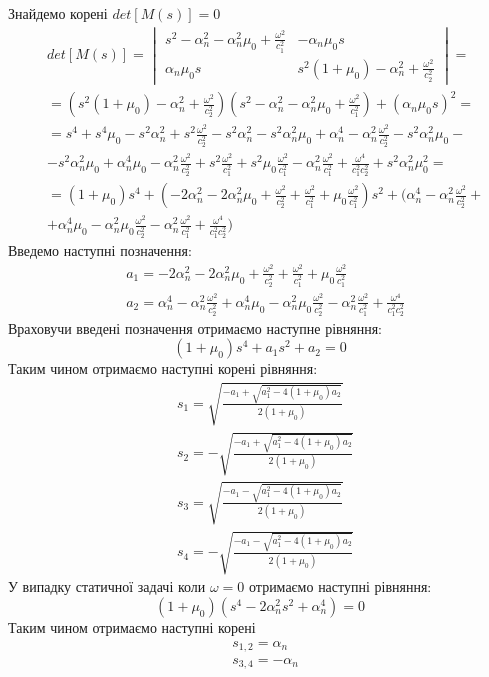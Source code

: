 Знайдемо корені $det[M(s)]=0$
\begin{align*}
    &det[M(s)] = 
    \begin{vmatrix}
        s^2 - \alpha_n^2 - \alpha_n^2\mu_0 + \frac{\omega^2}{c_1^2} & -\alpha_n \mu_0 s \\
        \alpha_n \mu_0 s & s^2 (1 + \mu_0) -\alpha_n^2 + \frac{\omega^2}{c_2^2}
     \end{vmatrix} = \\
    &= (s^2 (1 + \mu_0) -\alpha_n^2 + \frac{\omega^2}{c_2^2})(s^2 - \alpha_n^2 - \alpha_n^2\mu_0 + \frac{\omega^2}{c_1^2}) + (\alpha_n \mu_0 s)^2 = \\
    &= s^4 + s^4 \mu_0 - s^2 \alpha_n^2 + s^2 \frac{\omega^2}{c_2^2} - s^2 \alpha_n^2 - s^2 \alpha_n^2 \mu_0 + \alpha_n^4 - \alpha_n^2 \frac{\omega^2}{c_2^2} - s^2 \alpha_n^2 \mu_0 - \\
    &- s^2 \alpha_n^2 \mu_0 + \alpha_n^4 \mu_0 - \alpha_n^2 \frac{\omega^2}{c_2^2} + s^2 \frac{\omega^2}{c_1^2} + s^2 \mu_0 \frac{\omega^2}{c_1^2} - \alpha_n^2 \frac{\omega^2}{c_1^2} + \frac{\omega^4}{c_1^2 c_2^2} + s^2 \alpha_n^2 \mu_0^2 = \\
    &=(1 + \mu_0) s^4 + (-2 \alpha_n^2 - 2 \alpha_n^2 \mu_0 + \frac{\omega^2}{c_2^2} + \frac{\omega^2}{c_1^2} + \mu_0 \frac{\omega^2}{c_1^2}) s^2 + (\alpha_n^4 - \alpha_n^2 \frac{\omega^2}{c_2^2} + \\ 
    &+ \alpha_n^4 \mu_0 - \alpha_n^2 \mu_0 \frac{\omega^2}{c_2^2} - \alpha_n^2 \frac{\omega^2}{c_1^2} + \frac{\omega^4}{c_1^2 c_2^2})
\end{align*}
Введемо наступні позначення:
\begin{align*}
    &a_1 = -2 \alpha_n^2 - 2 \alpha_n^2 \mu_0 + \frac{\omega^2}{c_2^2} + \frac{\omega^2}{c_1^2} + \mu_0 \frac{\omega^2}{c_1^2} \\
    &a_2 = \alpha_n^4 - \alpha_n^2 \frac{\omega^2}{c_2^2} + \alpha_n^4 \mu_0 - \alpha_n^2 \mu_0 \frac{\omega^2}{c_2^2} - \alpha_n^2 \frac{\omega^2}{c_1^2} + \frac{\omega^4}{c_1^2 c_2^2}
\end{align*}
Враховучи введені позначення отримаємо наступне рівняння:
\begin{equation*}
    (1 + \mu_0) s^4 + a_1 s^2 + a_2 = 0
\end{equation*}
Таким чином отримаємо наступні корені рівняння:
\begin{align*}
    &s_1 = \sqrt{\frac{ -a_1 + \sqrt{a_1^2 - 4(1 + \mu_0)a_2}}{2 (1 + \mu_0)}} \\
    &s_2 = -\sqrt{\frac{ -a_1 + \sqrt{a_1^2 - 4(1 + \mu_0)a_2}}{2 (1 + \mu_0)}} \\
    &s_3 = \sqrt{\frac{ -a_1 - \sqrt{a_1^2 - 4(1 + \mu_0)a_2}}{2 (1 + \mu_0)}} \\
    &s_4 = -\sqrt{\frac{ -a_1 - \sqrt{a_1^2 - 4(1 + \mu_0)a_2}}{2 (1 + \mu_0)}}
\end{align*}
У випадку статичної задачі коли $\omega = 0$ отримаємо наступні рівняння:
\begin{equation*}
    (1 + \mu_0) (s^4 - 2 \alpha_n^2 s^2 + \alpha_n^4) = 0
\end{equation*}
Таким чином отримаємо наступні корені
\begin{align*}
    &s_{1,2} = \alpha_n \\
    &s_{3, 4} = -\alpha_n
\end{align*}
